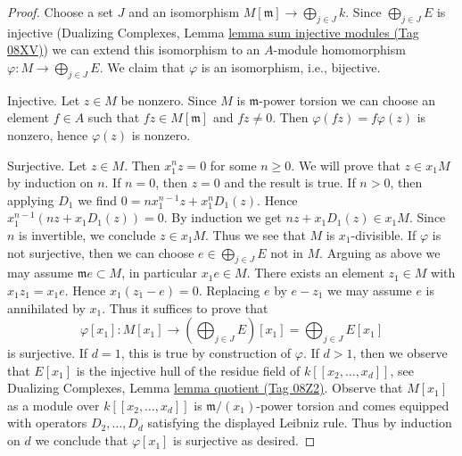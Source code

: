 \documentclass{amsart}
\theoremstyle{plain}
\theoremstyle{definition}
\theoremstyle{remark}
\numberwithin{equation}{subsection}
\begin{document}
\begin{proof}
Choose a set $J$ and an isomorphism $M[\mathfrak m] \to \bigoplus_{j \in J} k$.
Since $\bigoplus_{j \in J} E$ is injective
(Dualizing Complexes, Lemma \href{https://stacks.math.columbia.edu/tag/08XV}{lemma sum injective modules (Tag 08XV)})
we can extend this isomorphism to an $A$-module homomorphism
$\varphi : M \to \bigoplus_{j \in J} E$.
We claim that $\varphi$ is an isomorphism, i.e., bijective.

\medskip\noindent
Injective. Let $z \in M$ be nonzero. Since $M$ is $\mathfrak m$-power torsion
we can choose an element $f \in A$ such that $fz \in M[\mathfrak m]$ and
$fz \not = 0$. Then $\varphi(fz) = f\varphi(z)$ is nonzero, hence
$\varphi(z)$ is nonzero.

\medskip\noindent
Surjective. Let $z \in M$. Then $x_1^n z = 0$ for some $n \geq 0$.
We will prove that $z \in x_1M$ by induction on $n$.
If $n = 0$, then $z = 0$ and the result is true.
If $n > 0$, then applying $D_1$ we find $0 = n x_1^{n - 1} z + x_1^nD_1(z)$.
Hence $x_1^{n - 1}(nz + x_1D_1(z)) = 0$. By induction we get
$nz + x_1D_1(z) \in x_1M$. Since $n$ is invertible, we conclude
$z \in x_1M$. Thus we see that $M$ is $x_1$-divisible.
If $\varphi$ is not surjective, then we can choose
$e \in \bigoplus_{j \in J} E$ not in $M$.
Arguing as above we may assume $\mathfrak m e \subset M$,
in particular $x_1 e \in M$. There exists an element
$z_1 \in M$ with $x_1 z_1 = x_1 e$. Hence
$x_1(z_1 - e) = 0$. Replacing $e$ by $e - z_1$
we may assume $e$ is annihilated by $x_1$.
Thus it suffices to prove that
$$
\varphi[x_1] :
M[x_1]
\longrightarrow
\left(\bigoplus\nolimits_{j \in J} E\right)[x_1] =
\bigoplus\nolimits_{j \in J} E[x_1]
$$
is surjective. If $d = 1$, this is true by construction of $\varphi$.
If $d > 1$, then we observe that $E[x_1]$ is the injective hull
of the residue field of $k[[x_2, \ldots, x_d]]$, see
Dualizing Complexes, Lemma \href{https://stacks.math.columbia.edu/tag/08Z2}{lemma quotient (Tag 08Z2)}.
Observe that $M[x_1]$ as a module over $k[[x_2, \ldots, x_d]]$
is $\mathfrak m/(x_1)$-power torsion and comes
equipped with operators $D_2, \ldots, D_d$ satisfying
the displayed Leibniz rule.
Thus by induction on $d$ we conclude that $\varphi[x_1]$
is surjective as desired.
\end{proof}
\end{document}
